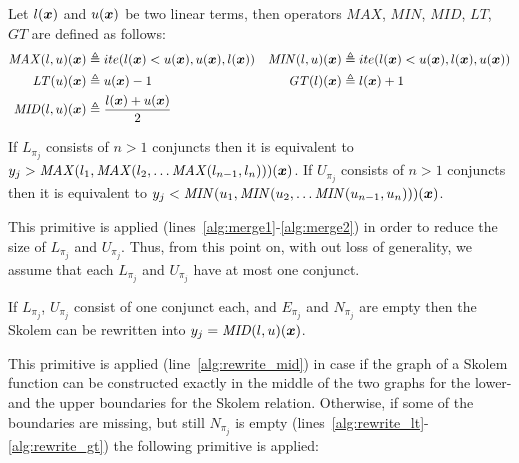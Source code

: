 \begin{definition}
Let $l(\vx)$ and $u(\vx)$ be two linear terms,
then operators $\mathit{MAX}$, $\mathit{MIN}$, $\mathit{MID}$, $\mathit{LT}$, $\mathit{GT}$ are defined as follows:
\begin{align*}
\mathit{MAX}(l, u) (\vx) &\triangleq ite (l (\vx) < u (\vx), u(\vx), l(\vx)) \notag &
\mathit{MIN}(l, u) (\vx) &\triangleq ite (l (\vx) < u (\vx), l(\vx), u(\vx)) \notag \\
\mathit{LT} (u) (\vx) &\triangleq u (\vx) -1 \notag &
\mathit{GT} (l) (\vx) &\triangleq l (\vx) + 1 \notag \\
\mathit{MID}(l, u) (\vx) &\triangleq \frac{l(\vx) + u(\vx)}{ 2} \notag 
\end{align*}
\end{definition}

\begin{lemma}
If $L_{\pi_j}$ consists of $n>1$ conjuncts then it is equivalent to $y_j > \mathit{MAX} (l_1, \mathit{MAX} (l_2,\ldots \mathit{MAX} (l_{n-1}, l_n) )) (\vx)$.
If $U_{\pi_j}$ consists of $n>1$ conjuncts then it is equivalent to $y_j < \mathit{MIN} (u_1, \mathit{MIN} (u_2,\ldots \mathit{MIN} (u_{n-1}, u_n) ))(\vx)$.
\end{lemma}
This primitive is applied (lines~\ref{alg:merge1}-\ref{alg:merge2}) in order to reduce the size of $L_{\pi_j}$ and $U_{\pi_j}$.
Thus, from this point on, with out
loss of generality, we assume that each $L_{\pi_j}$ and $U_{\pi_j}$
have at most one conjunct.

\begin{lemma}
If $L_{\pi_j}$, $U_{\pi_j}$ consist of one conjunct each, and $E_{\pi_j}$ and $N_{\pi_j}$ are empty then the Skolem can be rewritten into $y_j = \mathit{MID} (l, u)(\vx)$. 
\end{lemma}
This primitive is applied (line~\ref{alg:rewrite_mid}) in case if the graph of a Skolem function can be constructed exactly in the middle of the two graphs for the lower- and the upper boundaries for the Skolem relation.
Otherwise, if some of the boundaries are missing, but still $N_{\pi_j}$ is empty (lines~\ref{alg:rewrite_lt}-\ref{alg:rewrite_gt})  the following primitive is applied:

